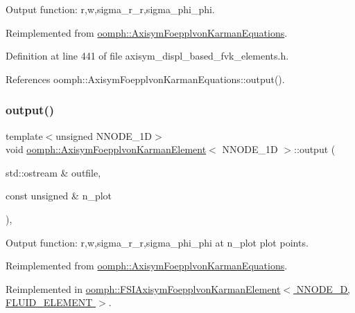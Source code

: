 Output function\+: r,w,sigma\+\_\+r\+\_\+r,sigma\+\_\+phi\+\_\+phi. 



Reimplemented from \hyperlink{classoomph_1_1AxisymFoepplvonKarmanEquations_a162b507ce3d9126a558790e77ec86e70}{oomph\+::\+Axisym\+Foepplvon\+Karman\+Equations}.



Definition at line 441 of file axisym\+\_\+displ\+\_\+based\+\_\+fvk\+\_\+elements.\+h.



References oomph\+::\+Axisym\+Foepplvon\+Karman\+Equations\+::output().

\mbox{\label{classoomph_1_1AxisymFoepplvonKarmanElement_a435aab946dfcaa0b23e7df59e9bc3933}} 
\subsubsection{\texorpdfstring{output()}{output()}\hspace{0.1cm}{\footnotesize\ttfamily [6/8]}}
{\footnotesize\ttfamily template$<$unsigned N\+N\+O\+D\+E\+\_\+1D$>$ \\
void \hyperlink{classoomph_1_1AxisymFoepplvonKarmanElement}{oomph\+::\+Axisym\+Foepplvon\+Karman\+Element}$<$ N\+N\+O\+D\+E\+\_\+1D $>$\+::output (\begin{DoxyParamCaption}\item[{std\+::ostream \&}]{outfile,  }\item[{const unsigned \&}]{n\+\_\+plot }\end{DoxyParamCaption})\hspace{0.3cm}{\ttfamily [inline]}, {\ttfamily [virtual]}}



Output function\+: r,w,sigma\+\_\+r\+\_\+r,sigma\+\_\+phi\+\_\+phi at n\+\_\+plot plot points. 



Reimplemented from \hyperlink{classoomph_1_1AxisymFoepplvonKarmanEquations_a704051a00a2c8624edb98f3ba05e63a2}{oomph\+::\+Axisym\+Foepplvon\+Karman\+Equations}.



Reimplemented in \hyperlink{classoomph_1_1FSIAxisymFoepplvonKarmanElement_a03c82e935db8c1c93dfe2f443ec5e817}{oomph\+::\+F\+S\+I\+Axisym\+Foepplvon\+Karman\+Element$<$ N\+N\+O\+D\+E\+\_\+D, F\+L\+U\+I\+D\+\_\+\+E\+L\+E\+M\+E\+N\+T $>$}.



